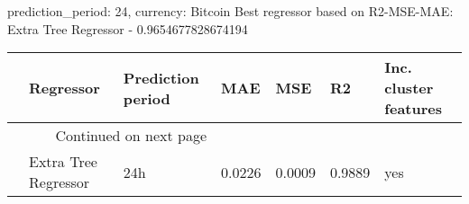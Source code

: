 
prediction_period: 24, currency: Bitcoin
Best regressor based on R2-MSE-MAE: Extra Tree Regressor - 0.9654677828674194
\begin{longtable}{lllllll}
\toprule
{} &             Regressor & Prediction period &     MAE &     MSE &      R2 & Inc. cluster features \\
\midrule
\endhead
\midrule
\multicolumn{3}{r}{{Continued on next page}} \\
\midrule
\endfoot

\bottomrule
\endlastfoot
0 &  Extra Tree Regressor &               24h &  0.0226 &  0.0009 &  0.9889 &                   yes \\
\end{longtable}
